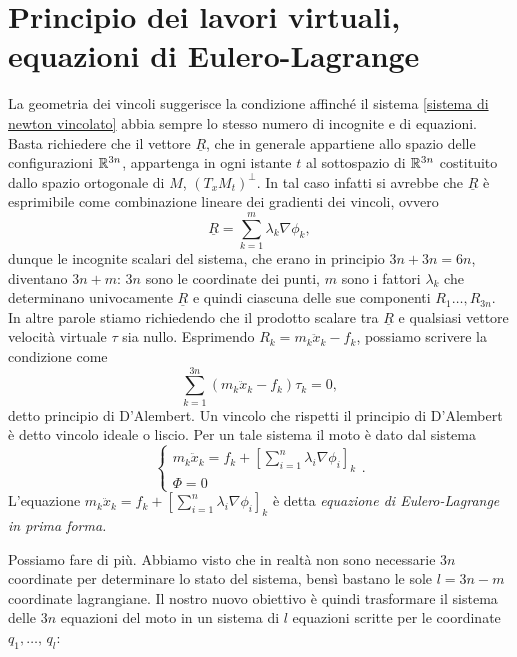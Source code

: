     \section{Principio dei lavori virtuali, equazioni di Eulero-Lagrange}
    La geometria dei vincoli suggerisce la condizione affinché il sistema \ref{sistema di newton vincolato} abbia sempre lo stesso numero di incognite e di equazioni. Basta richiedere che il vettore $\underline{R}$, che in generale appartiene allo spazio delle configurazioni $\mathbb{R}^{3n}$, appartenga in ogni istante $t$ al sottospazio di $\mathbb{R}^{3n}$ costituito dallo spazio ortogonale di $M$, $(T_xM_t)^\perp.$ In tal caso infatti si avrebbe che $\underline{R}$ è esprimibile come combinazione lineare dei gradienti dei vincoli, ovvero
    \begin{equation}
        \underline{R} = \sum_{k=1}^m \lambda_k \nabla \phi_k,
    \end{equation}
    dunque le incognite scalari del sistema, che erano in principio $3n+3n=6n$, diventano $3n+m$: $3n$ sono le coordinate dei punti, $m$ sono i fattori $\lambda_k$ che determinano univocamente $\underline{R}$ e quindi ciascuna delle sue componenti $R_1 \dots, R_{3n}$. In altre parole stiamo richiedendo che il prodotto scalare tra $\underline{R}$ e qualsiasi vettore velocità virtuale $\tau$ sia nullo. Esprimendo $R_k = m_k \ddot{x}_k -f_k$, possiamo scrivere la condizione come
   \begin{equation}
       \sum_{k=1}^{3n} (m_k \ddot{x}_k - f_k) \tau_k = 0,
   \end{equation}
   detto principio di D'Alembert. Un vincolo che rispetti il principio di D'Alembert è detto vincolo ideale o liscio. Per un tale sistema il moto è dato dal sistema
   \begin{equation}
       \begin{cases}
           m_k \ddot{x}_k = f_k + \left[\sum_{i=1}^n \lambda_i \nabla \phi_i\right]_k \\
           \Phi = 0
       \end{cases}.
   \end{equation}
   L'equazione $ m_k \ddot{x}_k = f_k + \left[\sum_{i=1}^n \lambda_i \nabla \phi_i\right]_k$ è detta \emph{equazione di Eulero-Lagrange in prima forma.}

   Possiamo fare di più. Abbiamo visto che in realtà non sono necessarie $3n$ coordinate per determinare lo stato del sistema, bensì bastano le sole $l=3n-m$ coordinate lagrangiane. Il nostro nuovo obiettivo è quindi trasformare il sistema delle $3n$ equazioni del moto in un sistema di $l$ equazioni scritte per le coordinate $q_1, \dots,\,q_l$:

